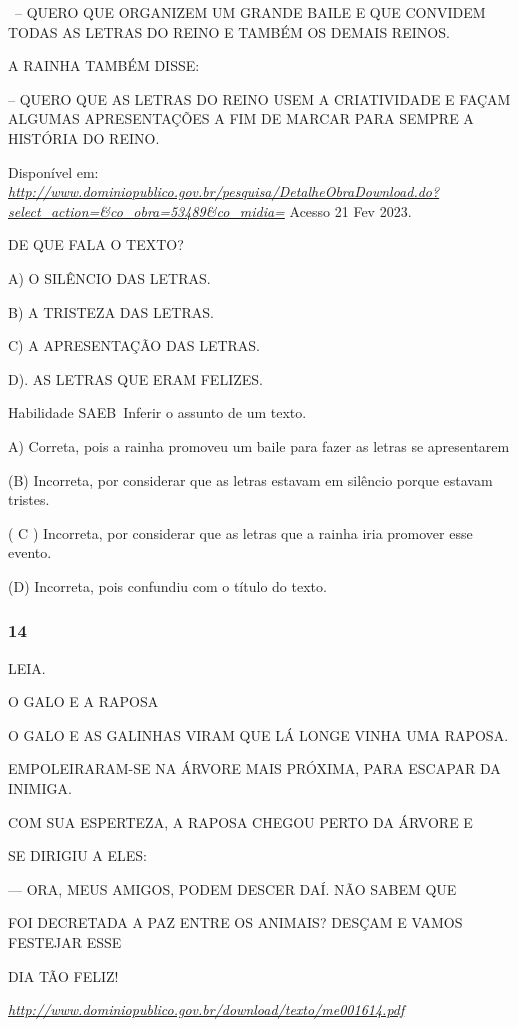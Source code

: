 ~-- QUERO QUE ORGANIZEM UM GRANDE BAILE E QUE CONVIDEM TODAS AS LETRAS
DO REINO E TAMBÉM OS DEMAIS REINOS.

A RAINHA TAMBÉM DISSE:

-- QUERO QUE AS LETRAS DO REINO USEM A CRIATIVIDADE E FAÇAM ALGUMAS
APRESENTAÇÕES A FIM DE MARCAR PARA SEMPRE A HISTÓRIA DO REINO.

Disponível em:
\href{http://www.dominiopublico.gov.br/pesquisa/DetalheObraDownload.do?select_action=\&co_obra=53489\&co_midia=}{\emph{http://www.dominiopublico.gov.br/pesquisa/DetalheObraDownload.do?select\_action=\&co\_obra=53489\&co\_midia=}}
Acesso 21 Fev 2023.

DE QUE FALA O TEXTO?

A) O SILÊNCIO DAS LETRAS.

B) A TRISTEZA DAS LETRAS.

C) A APRESENTAÇÃO DAS LETRAS.

D). AS LETRAS QUE ERAM FELIZES.

Habilidade SAEB~Inferir o assunto de um texto.

A) Correta, pois a rainha promoveu um baile para fazer as letras se
apresentarem

(B) Incorreta, por considerar que as letras estavam em silêncio porque
estavam tristes.

( C ) Incorreta, por considerar que as letras que a rainha iria promover
esse evento.

(D) Incorreta, pois confundiu com o título do texto.

\subsubsection{14}\label{section-86}

LEIA.

O GALO E A RAPOSA

O GALO E AS GALINHAS VIRAM QUE LÁ LONGE VINHA UMA RAPOSA.

EMPOLEIRARAM-SE NA ÁRVORE MAIS PRÓXIMA, PARA ESCAPAR DA INIMIGA.

COM SUA ESPERTEZA, A RAPOSA CHEGOU PERTO DA ÁRVORE E

SE DIRIGIU A ELES:

--- ORA, MEUS AMIGOS, PODEM DESCER DAÍ. NÃO SABEM QUE

FOI DECRETADA A PAZ ENTRE OS ANIMAIS? DESÇAM E VAMOS FESTEJAR ESSE

DIA TÃO FELIZ!

\href{http://www.dominiopublico.gov.br/download/texto/me001614.pdf}{\emph{http://www.dominiopublico.gov.br/download/texto/me001614.pdf}}

